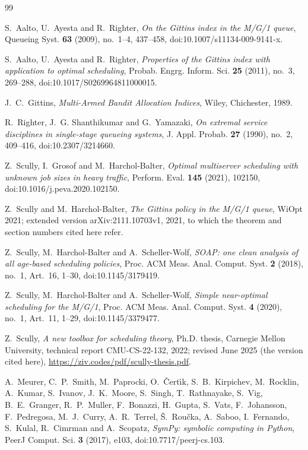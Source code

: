 \documentclass[11pt]{amsart}
\theoremstyle{remark}
\numberwithin{equation}{section}
\begin{document}
\begin{thebibliography}{99}

S.~Aalto, U.~Ayesta and R.~Righter, \emph{On the Gittins index in the
M/G/1 queue}, Queueing Syst. \textbf{63} (2009), no.~1--4, 437--458,
doi:10.1007/s11134-009-9141-x.

S.~Aalto, U.~Ayesta and R.~Righter, \emph{Properties of the Gittins index
with application to optimal scheduling}, Probab. Engrg. Inform. Sci.
\textbf{25} (2011), no.~3, 269--288, doi:10.1017/S0269964811000015.

J.~C.~Gittins, \emph{Multi-Armed Bandit Allocation Indices}, Wiley,
Chichester, 1989.

R.~Righter, J.~G. Shanthikumar and G.~Yamazaki, \emph{On extremal service
disciplines in single-stage queueing systems}, J. Appl. Probab.
\textbf{27} (1990), no.~2, 409--416, doi:10.2307/3214660.

Z.~Scully, I.~Grosof and M.~Harchol-Balter, \emph{Optimal multiserver
scheduling with unknown job sizes in heavy traffic}, Perform. Eval.
\textbf{145} (2021), 102150, doi:10.1016/j.peva.2020.102150.

Z.~Scully and M.~Harchol-Balter, \emph{The Gittins policy in the M/G/1
queue}, WiOpt 2021; extended version arXiv:2111.10703v1, 2021, to which the
theorem and section numbers cited here refer.

Z.~Scully, M.~Harchol-Balter and A.~Scheller-Wolf, \emph{SOAP: one clean
analysis of all age-based scheduling policies}, Proc. ACM Meas. Anal.
Comput. Syst. \textbf{2} (2018), no.~1, Art.~16, 1--30,
doi:10.1145/3179419.

Z.~Scully, M.~Harchol-Balter and A.~Scheller-Wolf, \emph{Simple
near-optimal scheduling for the M/G/1}, Proc. ACM Meas. Anal. Comput.
Syst. \textbf{4} (2020), no.~1, Art.~11, 1--29, doi:10.1145/3379477.

Z.~Scully, \emph{A new toolbox for scheduling theory}, Ph.D. thesis,
Carnegie Mellon University, technical report CMU-CS-22-132, 2022; revised
June 2025 (the version cited here), \url{https://ziv.codes/pdf/scully-thesis.pdf}.

A.~Meurer, C.~P.~Smith, M.~Paprocki, O.~\v{C}ert\'{\i}k,
S.~B.~Kirpichev, M.~Rocklin, A.~Kumar, S.~Ivanov, J.~K.~Moore, S.~Singh,
T.~Rathnayake, S.~Vig, B.~E.~Granger, R.~P.~Muller, F.~Bonazzi,
H.~Gupta, S.~Vats, F.~Johansson, F.~Pedregosa, M.~J.~Curry,
A.~R.~Terrel, \v{S}.~Rou\v{c}ka, A.~Saboo, I.~Fernando, S.~Kulal,
R.~Cimrman and A.~Scopatz,
\emph{SymPy: symbolic computing in Python}, PeerJ Comput. Sci.
\textbf{3} (2017), e103, doi:10.7717/peerj-cs.103.


\end{thebibliography}
\end{document}
